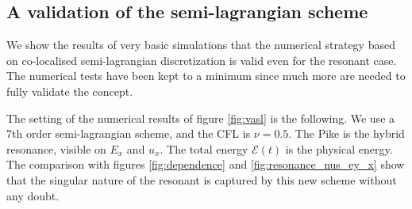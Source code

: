 

\FloatBarrier

\subsection{A validation of the semi-lagrangian scheme}

We show the results of very basic simulations that the numerical strategy 
based on co-localised semi-lagrangian discretization is valid even for the resonant 
case.
The numerical tests have been kept to a minimum since much more are needed to fully validate
the concept.

The setting of the numerical results of figure \ref{fig:vasl}
is the following. We use a 7th order semi-lagrangian scheme, and the CFL is $\nu=0.5$.
The Pike is the hybrid resonance, visible on $E_x$ and $u_x$.
The total energy $\mathcal E(t)$ is the physical energy. 
The comparison with figures \ref{fig:dependence} and \ref{fig:resonance_nus_ey_x} show that the 
singular nature of the resonant is captured by this new scheme without any doubt.

